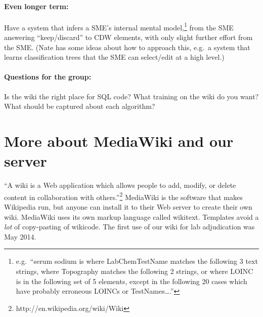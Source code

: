 \documentclass{tufte-handout}
\begin{document}
\paragraph{Even longer term:} Have a system that infers a SME's internal mental
model,\footnote{e.g.\ ``serum sodium is where LabChemTestName matches
  the following 3 text strings, where Topography matches the following
  2 strings, or where LOINC is in the following set of 5 elements,
  except in the following 20 cases which have probably erroneous
  LOINCs or TestNames\ldots{}.''} from the SME answering
``keep/discard'' to CDW elements, with only slight further effort from
the SME. (Nate has some ideas about how to approach this, e.g.\ a system that learns
classification trees that the SME can select/edit at a high level.)

\paragraph{Questions for the group:} Is the wiki the right place for
SQL code? What training on the wiki do you want? What should be
captured about each algorithm?

\section{More about MediaWiki and our server}

``A wiki is a Web application which allows people to add, modify, or
delete content in collaboration with
others.''\footnote{http://en.wikipedia.org/wiki/Wiki} MediaWiki is the
software that makes Wikipedia run, but anyone can install it to their
Web server to create their own wiki. MediaWiki uses its own markup
language called wikitext. Templates avoid a \emph{lot} of copy-pasting
of wikicode. The first use of our wiki for lab adjudication was May 2014.
\end{document}
